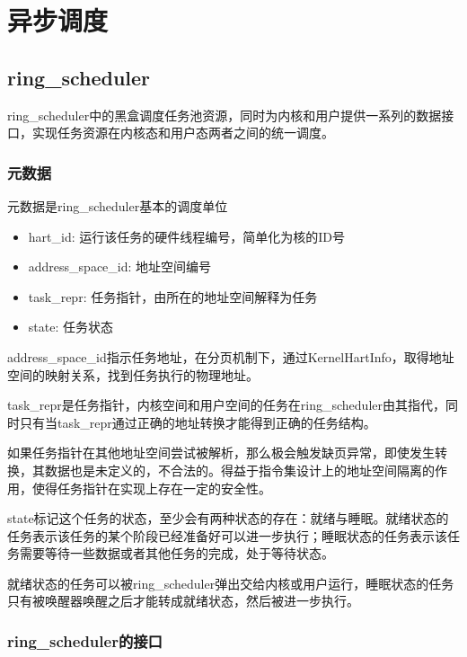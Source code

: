 \section{异步调度}

\subsection{ring\_scheduler}


ring\_scheduler中的黑盒调度任务池资源，同时为内核和用户提供一系列的数据接口，实现任务资源在内核态和用户态两者之间的统一调度。

\subsubsection{元数据}

元数据是ring\_scheduler基本的调度单位

\begin{itemize}
\item hart\_id: 运行该任务的硬件线程编号，简单化为核的ID号
\item address\_space\_id: 地址空间编号
\item task\_repr: 任务指针，由所在的地址空间解释为任务
\item state: 任务状态
\end{itemize}


address\_space\_id指示任务地址，在分页机制下，通过KernelHartInfo，取得地址空间的映射关系，找到任务执行的物理地址。

task\_repr是任务指针，内核空间和用户空间的任务在ring\_scheduler由其指代，同时只有当task\_repr通过正确的地址转换才能得到正确的任务结构。

如果任务指针在其他地址空间尝试被解析，那么极会触发缺页异常，即使发生转换，其数据也是未定义的，不合法的。得益于指令集设计上的地址空间隔离的作用，使得任务指针在实现上存在一定的安全性。


state标记这个任务的状态，至少会有两种状态的存在：就绪与睡眠。就绪状态的任务表示该任务的某个阶段已经准备好可以进一步执行；睡眠状态的任务表示该任务需要等待一些数据或者其他任务的完成，处于等待状态。

就绪状态的任务可以被ring\_scheduler弹出交给内核或用户运行，睡眠状态的任务只有被唤醒器唤醒之后才能转成就绪状态，然后被进一步执行。

\subsubsection{ring\_scheduler的接口}

